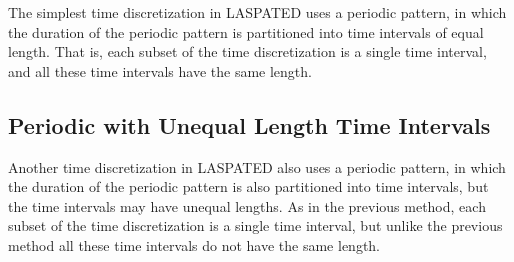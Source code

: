 \documentclass[article]{jss}
\newcommand{\ignore}[1]{}
\begin{document}
The simplest time discretization in LASPATED uses a periodic pattern, in which the duration of the periodic pattern is partitioned into time intervals of equal length.
That is, each subset of the time discretization is a single time interval, and all these time intervals have the same length.

\ignore{
The duration of a period, in the time unit of the first argument of the method, is specified in the third argument of the method.
Therefore, the third argument needs to be a multiple of the second argument: it is the duration of an elementary time window times the number of elementary time windows in a period.
In Example \ref{list:1}, we consider two such discretizations.
In the first one, we want to count the number of arrivals for every day of the week.
Therefore, the first argument of add\_time\_discretization is 'D' (the time unit is a day), the second argument is 1 (an elementary time window lasts 1 day), and the third argument is 7 (the one week period has 7 days).
In the second discretization, we want to count the number of arrivals in time windows of 30 mins every day.
Therefore, the first argument of add\_time\_discretization is 'm' (the time unit is a minute), the second argument is 30 (an elementary time window lasts 30 minutes), and the third argument is 30*48 (the one day period has 30*48 minutes).

\begin{lstlisting}[label={list:1},caption=Elementary time windows repetition.]
# 7 days in a week
app.add_time_discretization('D', 1, 7)

# 48 30-minutes slots in a day
app.add_time_discretization('m', 30, 30*48)
\end{lstlisting}
}


\subsection{Periodic with Unequal Length Time Intervals}

Another time discretization in LASPATED also uses a periodic pattern, in which the duration of the periodic pattern is also partitioned into time intervals, but the time intervals may have unequal lengths.
As in the previous method, each subset of the time discretization is a single time interval, but unlike the previous method all these time intervals do not have the same length.
\end{document}
